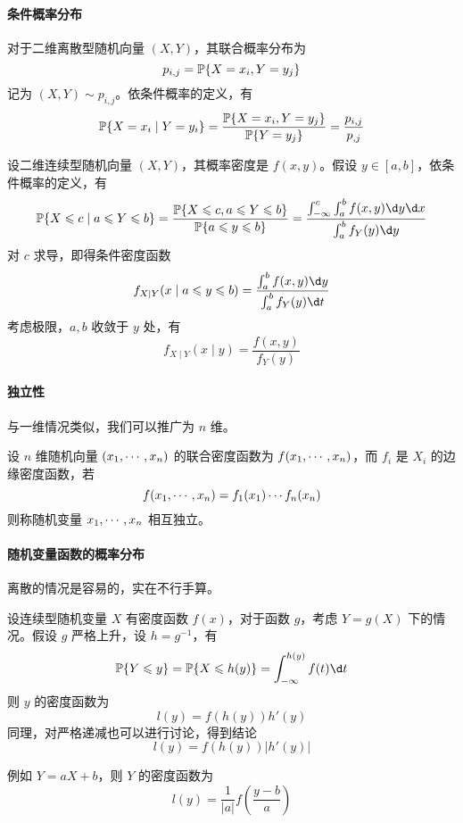 \paragraph{条件概率分布}

对于二维离散型随机向量 $(X, Y)$，其联合概率分布为
\[ p_{i,j} = \mathbb{P}\{X= x_i, Y = y_j\} \]
记为 $(X,Y) \sim p_{i,j}$。依条件概率的定义，有
\[ \mathbb{P}\{ X = x_i \mid Y = y_i \} = \frac{\mathbb{P}\{X = x_i, Y = y_j\}}{\mathbb{P}\{Y=y_j\}} = \frac{p_{i, j}}{p_{, j}} \]

设二维连续型随机向量 $(X, Y)$，其概率密度是 $f(x, y)$。假设 $y \in [a, b]$，依条件概率的定义，有
\[ \bbP\{X \leqslant c \mid a \leqslant Y \leqslant b\} = \frac{\bbP\{X \leqslant c , a \leqslant Y \leqslant b\}}{\bbP\{a \leqslant y \leqslant b \}} = \frac{\int_{-\infty}^c \int_{a}^b f(x, y) \d y \d x }{\int_a^b f_Y(y) \d y }\]
对 $c$ 求导，即得条件密度函数
\[ f_{X \mid Y}(x \mid a \leqslant y \leqslant b) = \frac{\int_{a}^b f(x, y) \d y}{\int_{a}^b f_{Y}(y) \d t} \]
考虑极限，$a, b$ 收敛于 $y$ 处，有
\[ f_{X \mid Y}(x \mid y) = \frac{f(x, y)}{f_{Y}(y)} \]

\paragraph{独立性}

与一维情况类似，我们可以推广为 $n$ 维。

\begin{definition}
	设 $n$ 维随机向量 $(x_1,\cdots,x_n)$ 的联合密度函数为 $f(x_1,\cdots,x_n)$，而 $f_i$ 是 $X_i$ 的边缘密度函数，若
	\[ f(x_1,\cdots,x_n) = f_1(x_1) \cdots f_n(x_n) \]
	则称随机变量 $x_1,\cdots,x_n$ 相互独立。
\end{definition}

\paragraph{随机变量函数的概率分布}

离散的情况是容易的，实在不行手算。

设连续型随机变量 $X$ 有密度函数 $f(x)$，对于函数 $g$，考虑 $Y=g(X)$ 下的情况。假设 $g$ 严格上升，设 $h = g^{-1}$，有
\[ \bbP\{Y \leqslant y\} = \bbP\{X \leqslant h(y)\} = \int_{-\infty}^{h(y)} f(t) \d t \]
则 $y$ 的密度函数为
\[ l(y) = f(h(y)) h'(y) \]
同理，对严格递减也可以进行讨论，得到结论
\[ l(y) = f(h(y)) |h'(y)| \]

例如 $Y = aX+b$，则 $Y$ 的密度函数为
\[ l(y) = \frac{1}{|a|}f\left(\frac{y-b}{a}\right) \]

